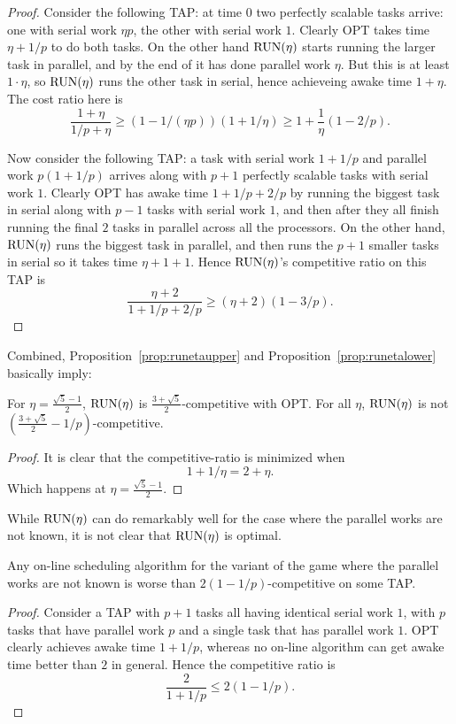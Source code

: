 \begin{proof}
  Consider the following TAP: at time $0$ two perfectly scalable
  tasks arrive: one with serial work $\eta p$, the other with
  serial work $1$. Clearly OPT takes time $\eta + 1/p$ to do both
  tasks. On the other hand $\operatorname{\text{RUN}}(\eta)$ starts running the larger
  task in parallel, and by the end of it has done parallel work
  $\eta$. But this is at least $1\cdot \eta$, so $\operatorname{\text{RUN}}(\eta)$
  runs the other task in serial, hence achieveing awake time
  $1+\eta$. The cost ratio here is 
  $$\frac{1+\eta}{1/p+\eta} \ge (1-1/(\eta p))(1+1/\eta) \ge
  1+ \frac{1}{\eta} (1-2/p).$$

 Now consider the following TAP: a task with serial work
 $1+1/p$ and parallel work $p(1+1/p)$ arrives along with
 $p+1$ perfectly scalable tasks with serial work $1$. Clearly OPT
 has awake time $1+1/p + 2/p$ by running the biggest task in
 serial along with $p-1$ tasks with serial work $1$, and then
 after they all finish running the final $2$ tasks in parallel
 across all the processors.
 On the other hand, $\operatorname{\text{RUN}}(\eta)$ runs the biggest task in
 parallel, and then runs the $p+1$ smaller tasks in serial so it
 takes time $\eta + 1 + 1$. Hence $\operatorname{\text{RUN}}(\eta)$'s competitive
 ratio on this TAP is $$\frac{\eta+2}{1+1/p+2/p}\ge
 (\eta+2)(1-3/p).$$
\end{proof}

Combined, Proposition~\ref{prop:runetaupper} and
Proposition~\ref{prop:runetalower} basically imply:
\begin{corollary}
  For $\eta=\frac{\sqrt{5}-1}{2}$, $\operatorname{\text{RUN}}(\eta)$ is
  $\frac{3+\sqrt{5}}{2}$-competitive with OPT.
  For all $\eta$, $\operatorname{\text{RUN}}(\eta)$ is not
  $\left(\frac{3+\sqrt{5}}{2}-1/p\right)$-competitive.
\end{corollary}
\begin{proof}
  It is clear that the competitive-ratio is minimized when
  $$1+1/\eta = 2+\eta.$$
  Which happens at $\eta=\frac{\sqrt{5}-1}{2}$.
\end{proof}

While $\operatorname{\text{RUN}}(\eta)$ can do remarkably well for the case where the
parallel works are not known, it is not clear that $\operatorname{\text{RUN}}(\eta)$
is optimal.
\begin{proposition}
  Any on-line scheduling algorithm for the variant of the game
  where the parallel works are not known is worse than 
  $2(1-1/p)$-competitive on some TAP.
\end{proposition}
\begin{proof}
  Consider a TAP with $p+1$ tasks all having identical serial
  work $1$, with $p$ tasks that have parallel work $p$ and a
  single task that has parallel work $1$. 
  OPT clearly achieves awake time $1+1/p$, whereas no on-line
  algorithm can get awake time better than $2$ in general. 
  Hence the competitive ratio is 
  $$\frac{2}{1+1/p} \le 2(1-1/p).$$
\end{proof}


